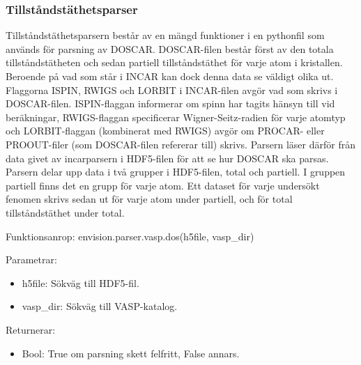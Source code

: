 \documentclass[a4paper,12pt]{article}
\begin{document}
\subsubsection{Tillståndstäthetsparser}
\label{ch:dosparser}
Tillståndstäthetsparsern består av en mängd funktioner i en pythonfil som används för parsning av DOSCAR. DOSCAR-filen består först av den totala tillståndstätheten och sedan partiell tillståndstäthet för varje atom i kristallen. Beroende på vad som står i INCAR kan dock denna data se väldigt olika ut. Flaggorna ISPIN, RWIGS och LORBIT i INCAR-filen avgör vad som skrivs i DOSCAR-filen. ISPIN-flaggan informerar om spinn har tagits hänsyn till vid beräkningar, RWIGS-flaggan specificerar Wigner-Seitz-radien för varje atomtyp och LORBIT-flaggan (kombinerat med RWIGS) avgör om PROCAR- eller PROOUT-filer (som DOSCAR-filen refererar till) skrivs. Parsern läser därför från data givet av incarparsern i HDF5-filen för att se hur DOSCAR ska parsas.
Parsern delar upp data i två grupper i HDF5-filen, total och partiell. I gruppen partiell finns det en grupp för varje atom. Ett dataset för varje undersökt fenomen skrivs sedan ut för varje atom under partiell, och för total tillståndstäthet under total.

Funktionsanrop: envision.parser.vasp.dos(h5file, vasp\_dir)

Parametrar:
\begin{itemize}
\setlength\itemsep{0em}
\item h5file: Sökväg till HDF5-fil.
\item vasp\_dir: Sökväg till VASP-katalog.
\end{itemize}

Returnerar:
\begin{itemize}
\setlength\itemsep{0em}
\item Bool: True om parsning skett felfritt, False annars.
\end{itemize}

\end{document}
